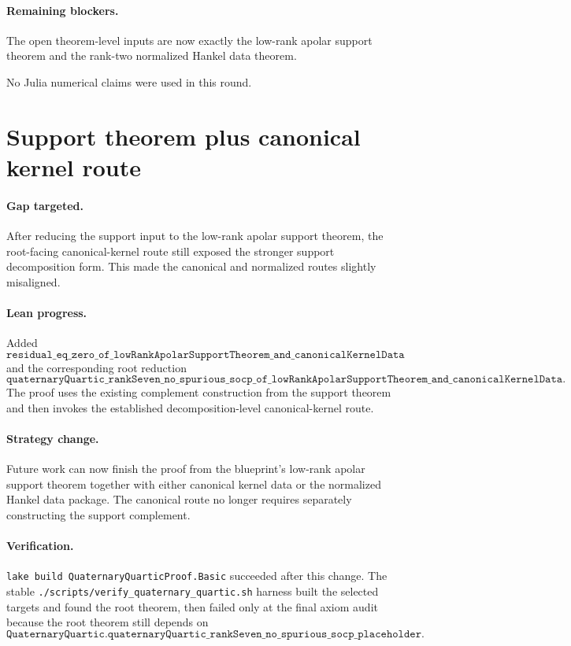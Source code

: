 \documentclass[11pt]{article}
\begin{document}
\paragraph{Remaining blockers.}
The open theorem-level inputs are now exactly the low-rank apolar support
theorem and the rank-two normalized Hankel data theorem.

No Julia numerical claims were used in this round.

\section*{Support theorem plus canonical kernel route}

\paragraph{Gap targeted.}
After reducing the support input to the low-rank apolar support theorem, the
root-facing canonical-kernel route still exposed the stronger support
decomposition form.  This made the canonical and normalized routes slightly
misaligned.

\paragraph{Lean progress.}
Added
\[
\texttt{residual\_eq\_zero\_of\_lowRankApolarSupportTheorem\_and\_canonicalKernelData}
\]
and the corresponding root reduction
\[
\texttt{quaternaryQuartic\_rankSeven\_no\_spurious\_socp\_of\_lowRankApolarSupportTheorem\_and\_canonicalKernelData}.
\]
The proof uses the existing complement construction from the support theorem
and then invokes the established decomposition-level canonical-kernel route.

\paragraph{Strategy change.}
Future work can now finish the proof from the blueprint's low-rank apolar
support theorem together with either canonical kernel data or the normalized
Hankel data package.  The canonical route no longer requires separately
constructing the support complement.

\paragraph{Verification.}
\texttt{lake build QuaternaryQuarticProof.Basic} succeeded after this change.
The stable \texttt{./scripts/verify\_quaternary\_quartic.sh} harness built the
selected targets and found the root theorem, then failed only at the final axiom
audit because the root theorem still depends on
\[
\texttt{QuaternaryQuartic.quaternaryQuartic\_rankSeven\_no\_spurious\_socp\_placeholder}.
\]
\end{document}
